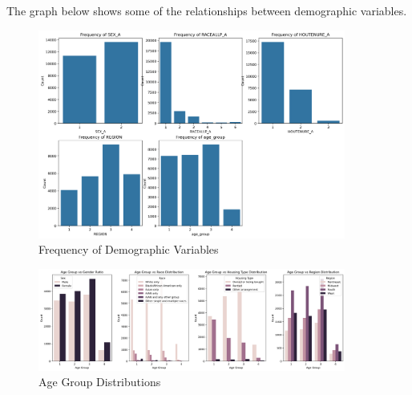 \documentclass{article}
\begin{document}
The graph below shows some of the relationships between demographic variables.

\newpage
\begin{figure}[!h]
	\centering
	\includegraphics[width=0.9\textwidth]{../Image/singelF.png}
	\caption{Frequency of Demographic Variables}
	\label{fig:SF1}
\end{figure}
\begin{figure}[!h]
	\centering
	\includegraphics[width=0.9\textwidth]{../Image/age_distributions.png}
	\caption{Age Group Distributions}
	\label{fig:age_distributions}
\end{figure}
\end{document}
